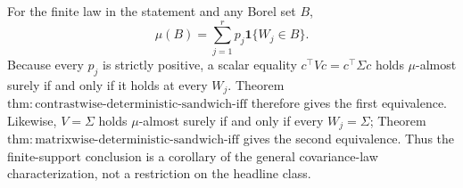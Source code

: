 For the finite law in the statement and any Borel set \(B\),
\[
 \mu(B)=\sum_{j=1}^rp_j\mathbf1\{W_j\in B\}. \tag{1}
\]
Because every \(p_j\) is strictly positive, a scalar equality \(c^\top Vc=c^\top\Sigma c\) holds \(\mu\)-almost surely if and only if it holds at every \(W_j\). Theorem \(\mathrm{thm:contrastwise\text{-}deterministic\text{-}sandwich\text{-}iff}\) therefore gives the first equivalence. Likewise, \(V=\Sigma\) holds \(\mu\)-almost surely if and only if every \(W_j=\Sigma\); Theorem \(\mathrm{thm:matrixwise\text{-}deterministic\text{-}sandwich\text{-}iff}\) gives the second equivalence. Thus the finite-support conclusion is a corollary of the general covariance-law characterization, not a restriction on the headline class.